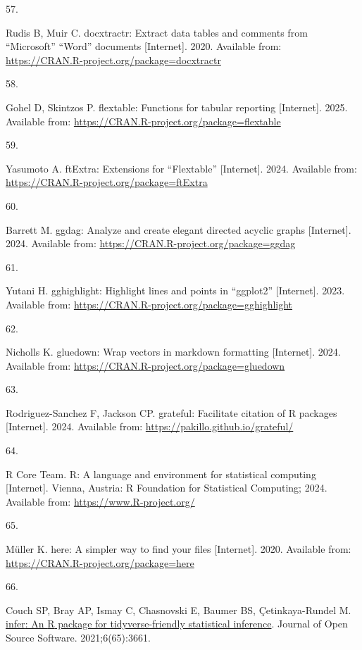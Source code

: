 \documentclass[
]{article}
\newlength{\cslhangindent}
\newlength{\csllabelwidth}
\newenvironment{CSLReferences}[2] %
 {\begin{list}{}{%
  \setlength{\itemindent}{0pt}
  \setlength{\leftmargin}{0pt}
  \setlength{\parsep}{0pt}
  \ifodd #1
   \setlength{\leftmargin}{\cslhangindent}
   \setlength{\itemindent}{-1\cslhangindent}
  \fi
  \setlength{\itemsep}{#2\baselineskip}}}
 {\end{list}}
\newcommand{\CSLLeftMargin}[1]{\parbox[t]{\csllabelwidth}{\strut#1\strut}}
\newcommand{\CSLRightInline}[1]{\parbox[t]{\linewidth - \csllabelwidth}{\strut#1\strut}}
\begin{document}
\begin{CSLReferences}{0}{1}
\CSLLeftMargin{57. }%
\CSLRightInline{Rudis B, Muir C. {docxtractr}: Extract data tables and comments from {``{Microsoft}''} {``{Word}''} documents {[}Internet{]}. 2020. Available from: \url{https://CRAN.R-project.org/package=docxtractr}}

\CSLLeftMargin{58. }%
\CSLRightInline{Gohel D, Skintzos P. {flextable}: Functions for tabular reporting {[}Internet{]}. 2025. Available from: \url{https://CRAN.R-project.org/package=flextable}}

\CSLLeftMargin{59. }%
\CSLRightInline{Yasumoto A. {ftExtra}: Extensions for {``{Flextable}''} {[}Internet{]}. 2024. Available from: \url{https://CRAN.R-project.org/package=ftExtra}}

\CSLLeftMargin{60. }%
\CSLRightInline{Barrett M. {ggdag}: Analyze and create elegant directed acyclic graphs {[}Internet{]}. 2024. Available from: \url{https://CRAN.R-project.org/package=ggdag}}

\CSLLeftMargin{61. }%
\CSLRightInline{Yutani H. {gghighlight}: Highlight lines and points in {``{ggplot2}''} {[}Internet{]}. 2023. Available from: \url{https://CRAN.R-project.org/package=gghighlight}}

\CSLLeftMargin{62. }%
\CSLRightInline{Nicholls K. {gluedown}: Wrap vectors in markdown formatting {[}Internet{]}. 2024. Available from: \url{https://CRAN.R-project.org/package=gluedown}}

\CSLLeftMargin{63. }%
\CSLRightInline{Rodriguez-Sanchez F, Jackson CP. {grateful}: Facilitate citation of {R} packages {[}Internet{]}. 2024. Available from: \url{https://pakillo.github.io/grateful/}}

\CSLLeftMargin{64. }%
\CSLRightInline{R Core Team. {R}: A language and environment for statistical computing {[}Internet{]}. Vienna, Austria: R Foundation for Statistical Computing; 2024. Available from: \url{https://www.R-project.org/}}

\CSLLeftMargin{65. }%
\CSLRightInline{Müller K. {here}: A simpler way to find your files {[}Internet{]}. 2020. Available from: \url{https://CRAN.R-project.org/package=here}}

\CSLLeftMargin{66. }%
\CSLRightInline{Couch SP, Bray AP, Ismay C, Chasnovski E, Baumer BS, Çetinkaya-Rundel M. \href{https://doi.org/10.21105/joss.03661}{{infer}: An {R} package for tidyverse-friendly statistical inference}. Journal of Open Source Software. 2021;6(65):3661. }


\end{CSLReferences}
\end{document}
